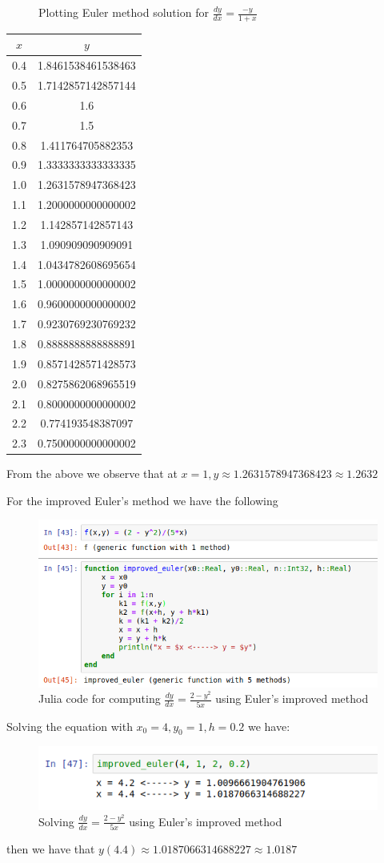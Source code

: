 \documentclass[a4paper,12pt,openany]{book}
\begin{document}
\begin{soln}
\begin{figure}[H]
	\caption{Plotting Euler method solution for $\frac{dy}{dx} = \frac{-y}{1 + x} $ }
\end{figure}
\begin{tabular}{|c|c|}
	\hline
	$x$ & $y$ \\
	\hline
	0.4 & 1.8461538461538463\\
	0.5 & 1.7142857142857144\\
	0.6 & 1.6\\
	0.7 & 1.5\\
	0.8 & 1.411764705882353\\
	0.9 & 1.3333333333333335\\
	1.0 & 1.2631578947368423\\
	1.1 & 1.2000000000000002\\
	1.2 & 1.142857142857143\\
	1.3 & 1.090909090909091\\
	1.4 & 1.0434782608695654\\
	1.5 & 1.0000000000000002\\
	1.6 & 0.9600000000000002\\
	1.7 & 0.9230769230769232\\
	1.8 & 0.8888888888888891\\
	1.9 & 0.8571428571428573\\
	2.0 & 0.8275862068965519\\
	2.1 & 0.8000000000000002\\
	2.2 & 0.774193548387097\\
	2.3 & 0.7500000000000002\\
	\hline
\end{tabular}


From the above we observe that at $x = 1, y \approx 1.2631578947368423 \approx 1.2632$

For the improved Euler's method we have the following
\begin{figure}[H]
	\centering
	\includegraphics[width= .7\linewidth]{pic16}
	\caption{Julia code for computing $ \frac{dy}{dx} = \frac{2-y^2}{5x}$ using Euler's improved method}
\end{figure}
Solving the equation with $x_0 = 4, y_0 = 1, h = 0.2$ we have:
\begin{figure}[H]
	\centering
	\includegraphics[width= .7\linewidth]{pic17}
	\caption{Solving $ \frac{dy}{dx} = \frac{2-y^2}{5x}$ using Euler's improved method}
\end{figure}
then we have that $ y(4.4) \approx 1.0187066314688227 \approx 1.0187$
\end{soln}
\end{document}
